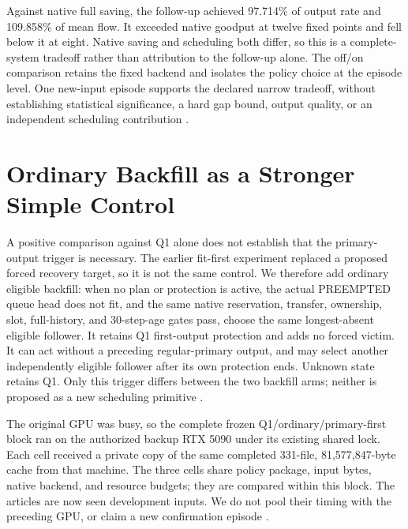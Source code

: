 \documentclass[10pt]{article}
\begin{document}
Against native full saving, the follow-up achieved 97.714\% of output rate and 109.858\% of mean flow. It exceeded native goodput at twelve fixed points and fell below it at eight. Native saving and scheduling both differ, so this is a complete-system tradeoff rather than attribution to the follow-up alone. The off/on comparison retains the fixed backend and isolates the policy choice at the episode level. One new-input episode supports the declared narrow tradeoff, without establishing statistical significance, a hard gap bound, output quality, or an independent scheduling contribution \cite{sparefresh}.

\section{Ordinary Backfill as a Stronger Simple Control}
A positive comparison against Q1 alone does not establish that the primary-output trigger is necessary. The earlier fit-first experiment replaced a proposed forced recovery target, so it is not the same control. We therefore add ordinary eligible backfill: when no plan or protection is active, the actual PREEMPTED queue head does not fit, and the same native reservation, transfer, ownership, slot, full-history, and 30-step-age gates pass, choose the same longest-absent eligible follower. It retains Q1 first-output protection and adds no forced victim. It can act without a preceding regular-primary output, and may select another independently eligible follower after its own protection ends. Unknown state retains Q1. Only this trigger differs between the two backfill arms; neither is proposed as a new scheduling primitive \cite{waitercontrol}.

The original GPU was busy, so the complete frozen Q1/ordinary/primary-first block ran on the authorized backup RTX 5090 under its existing shared lock. Each cell received a private copy of the same completed 331-file, 81,577,847-byte cache from that machine. The three cells share policy package, input bytes, native backend, and resource budgets; they are compared within this block. The articles are now seen development inputs. We do not pool their timing with the preceding GPU, or claim a new confirmation episode \cite{waitercontrol}.
\end{document}
